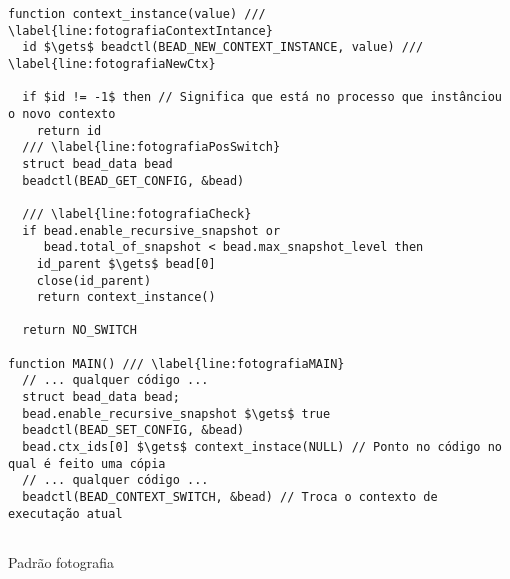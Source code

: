 \begin{pseudocode}
\begin{lstlisting}[language=pseudocode, style=pseudocode]
function context_instance(value) /// \label{line:fotografiaContextIntance}
  id $\gets$ beadctl(BEAD_NEW_CONTEXT_INSTANCE, value) /// \label{line:fotografiaNewCtx}

  if $id != -1$ then // Significa que está no processo que instânciou o novo contexto
    return id
  /// \label{line:fotografiaPosSwitch}
  struct bead_data bead
  beadctl(BEAD_GET_CONFIG, &bead)

  /// \label{line:fotografiaCheck}
  if bead.enable_recursive_snapshot or
     bead.total_of_snapshot < bead.max_snapshot_level then
    id_parent $\gets$ bead[0]
    close(id_parent)
    return context_instance()

  return NO_SWITCH

function MAIN() /// \label{line:fotografiaMAIN}
  // ... qualquer código ...
  struct bead_data bead;
  bead.enable_recursive_snapshot $\gets$ true
  beadctl(BEAD_SET_CONFIG, &bead)
  bead.ctx_ids[0] $\gets$ context_instace(NULL) // Ponto no código no qual é feito uma cópia
  // ... qualquer código ...
  beadctl(BEAD_CONTEXT_SWITCH, &bead) // Troca o contexto de executação atual
  
\end{lstlisting}

  \caption{Padrão fotografia}
  \label{alg:fotografia}
\end{pseudocode}
